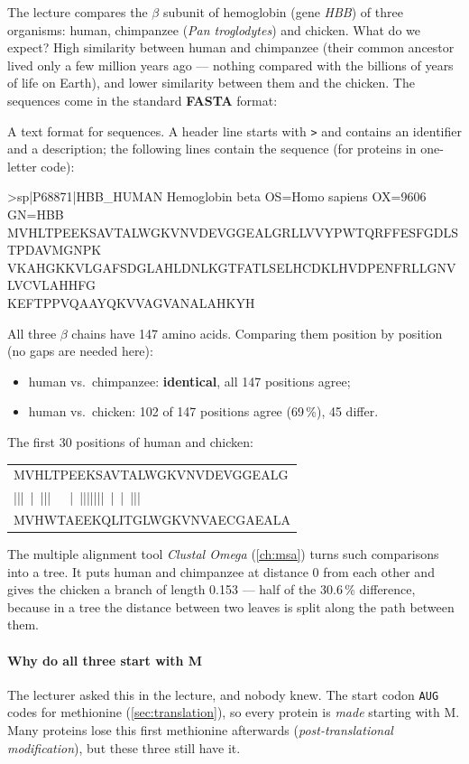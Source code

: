 \documentclass[11pt, oneside]{book}
\makeatletter
\newcommand{\seq}[1]{\texttt{#1}}
\newcommand{\alnblock}[1]{%
  \par\smallskip
  {\centering\ttfamily\small
   \begin{tabular}{@{}l@{}}#1\end{tabular}\par}%
  \smallskip}
\makeatother
\begin{document}
The lecture compares the $\beta$ subunit of hemoglobin (gene \emph{HBB}) of
three organisms: human, chimpanzee (\emph{Pan troglodytes}) and chicken. What
do we expect? High similarity between human and chimpanzee (their common
ancestor lived only a few million years ago --- nothing compared with the
billions of years of life on Earth), and lower similarity between them and the
chicken. The sequences come in the standard \textbf{FASTA} format:

\begin{defbox}[title={FASTA format}]
A text format for sequences. A header line starts with \seq{>} and contains an
identifier and a description; the following lines contain the sequence (for
proteins in one-letter code):

\smallskip
{\ttfamily\footnotesize
>sp|P68871|HBB\_HUMAN Hemoglobin beta OS=Homo sapiens OX=9606 GN=HBB\\
MVHLTPEEKSAVTALWGKVNVDEVGGEALGRLLVVYPWTQRFFESFGDLSTPDAVMGNPK\\
VKAHGKKVLGAFSDGLAHLDNLKGTFATLSELHCDKLHVDPENFRLLGNVLVCVLAHHFG\\
KEFTPPVQAAYQKVVAGVANALAHKYH}
\end{defbox}

\begin{exbox}[title={Human, chimpanzee and chicken hemoglobin}]
All three $\beta$ chains have 147 amino acids. Comparing them position by
position (no gaps are needed here):
\begin{itemize}
  \item human vs.\ chimpanzee: \textbf{identical}, all 147 positions agree;
  \item human vs.\ chicken: 102 of 147 positions agree (69\,\%), 45 differ.
\end{itemize}
The first 30 positions of human and chicken:

\alnblock{%
MVHLTPEEKSAVTALWGKVNVDEVGGEALG\\
|||~|~|||~~~|~|||||||~|~|~|||~\\
MVHWTAEEKQLITGLWGKVNVAECGAEALA}

The multiple alignment tool \emph{Clustal Omega} (\cref{ch:msa}) turns such
comparisons into a tree. It puts human and chimpanzee at distance 0 from each
other and gives the chicken a branch of length 0.153 --- half of the 30.6\,\%
difference, because in a tree the distance between two leaves is split along
the path between them.
\end{exbox}

\paragraph{Why do all three start with M}
The lecturer asked this in the lecture, and nobody knew. The start codon
\seq{AUG} codes for methionine (\cref{sec:translation}), so every protein is
\emph{made} starting with M. Many proteins lose this first methionine
afterwards (\emph{post-translational modification}), but these three still
have it.
\end{document}
